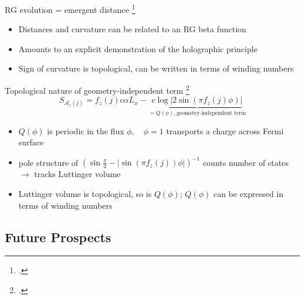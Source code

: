 \documentclass[8pt,aspectratio=169]{beamer}
\begin{document}
\begin{frame}{RG evolution = emergent distance}
	\footcite{maldacena1999large,ryu2006aspects,holzhey_1994}
\begin{itemize}
	\item Distances and curvature can be related to an RG \alert{beta function}\\[10pt]
	\item Amounts to an \alert{explicit demonstration} of the holographic principle\\[10pt]
	\item Sign of curvature is \alert{topological}, can be written in terms of winding numbers\\[10pt]
\end{itemize}
	
\end{frame}

\begin{frame}{Topological nature of geometry-independent term}
	\footcite{luttinger1960ground,luttinger1960fermi,oshikawa2000topological,seki2017topological,anirbanurg1,Heath_2020}
	\[S_{\mathcal{A}_z(j)} = f_z(j) c \alpha L_x - \underbrace{c \log \big|2\sin\left(\pi f_z(j)\phi\right)\big|}_{=Q(\phi),\text{geometry-independent term}}\]
	\begin{itemize}
	\item \(Q(\phi)\) is periodic in the flux \(\phi\), ~ \(\phi=1\) transports a charge across Fermi surface\\[10pt]
	\item pole structure of \(\left(\sin \frac{\pi}{4} - |\sin\left(\pi f_z(j)\right)\phi|\right)^{-1}\) counts number of states \(\longrightarrow\) tracks Luttinger volume\\[10pt]
	\item Luttinger volume is topological, so is \(Q(\phi)\); \(Q(\phi)\) can be expressed in terms of winding numbers
	\end{itemize}
	
\end{frame}

\begin{frame}{}
\section{Future Prospects}
\end{frame}
\end{document}
